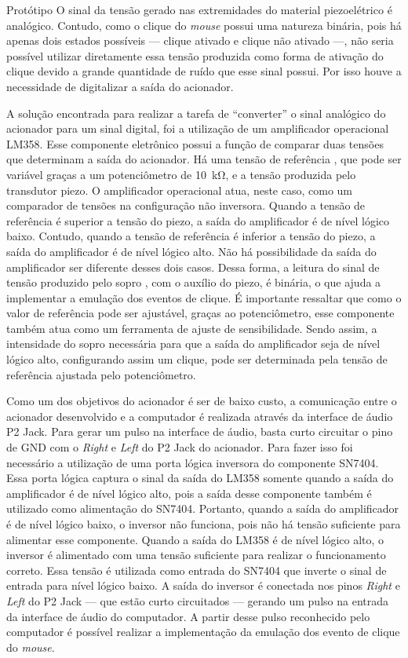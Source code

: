 \begin{chapter}{Protótipo}
O sinal da tensão gerado nas extremidades do material piezoelétrico é analógico.
Contudo, como o clique do \textit{mouse} possui uma natureza binária, pois há
apenas dois estados possíveis --- clique ativado e clique não ativado ---, não
seria possível utilizar diretamente essa tensão produzida como forma de ativação
do clique devido a grande quantidade de ruído que esse sinal possui. Por isso 
houve a necessidade de digitalizar a saída do acionador.

A solução encontrada para realizar a tarefa de ``converter'' o sinal analógico
do acionador para um sinal digital, foi a utilização de um amplificador
operacional LM358. Esse componente eletrônico possui a função de comparar duas
tensões que determinam a saída do acionador. Há uma tensão de referência
, que pode ser variável graças a um potenciômetro de 10~k\si{\ohm}, e a tensão
produzida pelo transdutor piezo. O amplificador operacional atua, neste caso,
como um comparador de tensões na configuração não inversora. Quando a tensão de
referência é superior a tensão do piezo, a saída do amplificador é de nível
lógico baixo. Contudo, quando a tensão de referência é inferior a tensão do
piezo, a saída do amplificador é de nível lógico alto. Não há possibilidade da
saída do amplificador ser diferente desses dois casos. Dessa forma, a leitura do
sinal de tensão produzido pelo sopro , com o auxílio do piezo, é binária, o que
ajuda a implementar a emulação dos eventos de clique. É importante ressaltar que
como o valor de referência pode ser ajustável, graças ao potenciômetro, esse
componente também atua como um ferramenta de ajuste de sensibilidade. Sendo
assim, a intensidade do sopro necessária para que a saída do amplificador seja
de nível lógico alto, configurando assim um clique, pode ser determinada pela
tensão de referência ajustada pelo potenciômetro.

Como um dos objetivos do acionador é ser de baixo custo, a comunicação entre o
acionador desenvolvido e a computador é realizada através da interface de áudio
P2 Jack. Para gerar um pulso na interface de áudio, basta curto circuitar o pino
de GND com o \textit{Right} e \textit{Left} do P2 Jack do acionador. Para fazer
isso foi necessário a utilização de uma porta lógica inversora do componente
SN7404. Essa porta lógica captura o sinal da saída do LM358 somente quando a
saída do amplificador é de nível lógico alto, pois a saída desse componente
também é utilizado como alimentação do SN7404. Portanto, quando a saída do
amplificador é de nível lógico baixo, o inversor não funciona, pois não há
tensão suficiente para alimentar esse componente. Quando a saída do LM358 é de
nível lógico alto, o inversor é alimentado com uma tensão suficiente para
realizar o funcionamento correto. Essa tensão é utilizada como entrada do
SN7404 que inverte o sinal de entrada para nível lógico baixo. A saída do
inversor é conectada nos pinos  \textit{Right} e \textit{Left} do P2 Jack --- que
estão curto circuitados --- gerando um pulso na entrada da interface
de áudio do computador. A partir desse pulso reconhecido pelo computador é
possível realizar a implementação da emulação dos evento de clique do
\textit{mouse}.


\end{chapter}
